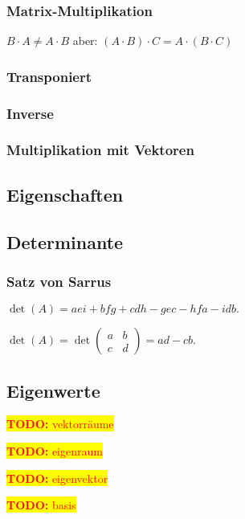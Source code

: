 \documentclass[10pt,a4paper]{article}
\newcommand{\todo}[1]{\begin{flushleft} \colorbox{yellow}{\textcolor{red}{\textbf{TODO:} {#1}}}\end{flushleft} }
\begin{document}
\subsubsection*{Matrix-Multiplikation}


$B \cdot A \neq A \cdot B $
aber:
$(A \cdot B) \cdot C = A \cdot (B \cdot C) $

\subsubsection*{Transponiert}

\subsubsection*{Inverse}

\subsubsection*{Multiplikation mit Vektoren}


\subsection{Eigenschaften}

\subsection{Determinante}


\subsubsection{Satz von Sarrus}
$\det(A) = aei + bfg + cdh - gec -hfa -idb.$

$\det(A) = \det \begin{pmatrix} a & b \\ c & d \end{pmatrix} = ad - cb.$

\subsection{Eigenwerte}




\todo{vektorräume}
\todo{eigenraum}
\todo{eigenvektor}
\todo{ basis }
\end{document}
